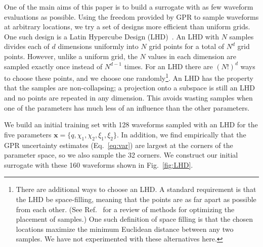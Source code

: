 \documentclass[prd,aps,letter,twocolumn,floatfix,notitlepage,nofootinbib]{revtex4-1}
\def\bx{\mathbf{x}}
\begin{document}
One of the main aims of this paper is to build a surrogate with as few waveform evaluations as possible. Using the freedom provided by GPR to sample waveforms at arbitrary locations, we try a set of designs more efficient than uniform grids. One such design is a Latin Hypercube Design (LHD)~\cite{McKayBeckmanConover1979}. An LHD with $N$ samples divides each of $d$ dimensions uniformly into $N$ grid points for a total of $N^d$ grid points. However, unlike a uniform grid, the $N$ values in each dimension are sampled exactly once instead of $N^{d-1}$ times. For an LHD there are $(N!)^d$ ways to choose these points, and we choose one randomly\footnote{There are additional ways to choose an LHD. A standard requirement is that the LHD be space-filling, meaning that the points are as far apart as possible from each other. (See Ref.~\cite{Husslage2011} for a review of methods for optimizing the placement of samples.) One such definition of space filling is that the chosen locations maximize the minimum Euclidean distance between any two samples. We have not experimented with these alternatives here.}. An LHD has the property that the samples are non-collapsing; a projection onto a subspace is still an LHD and no points are repeated in any dimension. This avoids wasting samples when one of the parameters has much less of an influence than the other parameters. 

We build an initial training set with 128 waveforms sampled with an LHD for the five parameters $\bx = \{q, \chi_1, \chi_2, \xi_1, \xi_2\}$. 
In addition, we find empirically that the GPR uncertainty estimates (Eq.~\eqref{eq:var})
are largest at the corners of the parameter space, so we also sample the 32 corners. We construct our initial surrogate with these 160 waveforms shown in Fig.~\ref{fig:LHD}.
\end{document}
